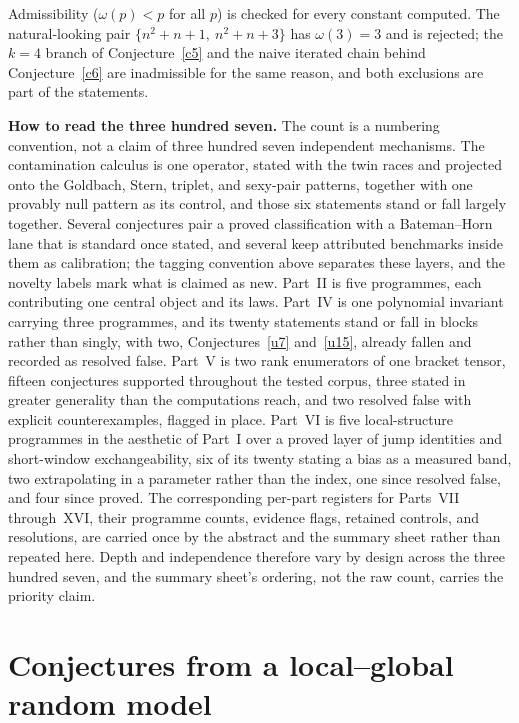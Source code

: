\documentclass[11pt]{article}
\theoremstyle{definition}
\begin{document}
Admissibility ($\omega(p)<p$ for all $p$) is checked for every constant
computed.  The natural-looking pair $\{n^2+n+1,\ n^2+n+3\}$ has
$\omega(3)=3$ and is
rejected; the $k=4$ branch of Conjecture~\ref{c5} and the naive
iterated chain behind Conjecture~\ref{c6} are inadmissible for the
same reason, and both exclusions are part of the statements.

\medskip
\noindent\textbf{How to read the three hundred seven.}  The count is a numbering convention, not a claim of three hundred seven independent mechanisms.  The contamination calculus is one operator, stated with the twin races and projected onto the Goldbach, Stern, triplet, and sexy-pair patterns, together with one provably null pattern as its control, and those six statements stand or fall largely together.  Several conjectures pair a proved classification with a Bateman--Horn lane that is standard once stated, and several keep attributed benchmarks inside them as calibration; the tagging convention above separates these layers, and the novelty labels mark what is claimed as new.  Part~II is five programmes, each contributing one central object and its laws.  Part~IV is one polynomial invariant carrying three programmes, and its twenty statements stand or fall in blocks rather than singly, with two, Conjectures~\ref{u7} and~\ref{u15}, already fallen and recorded as resolved false.  Part~V is two rank enumerators of one bracket tensor, fifteen conjectures supported throughout the tested corpus, three stated in greater generality than the computations reach, and two resolved false with explicit counterexamples, flagged in place.  Part~VI is five local-structure programmes in the aesthetic of Part~I over a proved layer of jump identities and short-window exchangeability, six of its twenty stating a bias as a measured band, two extrapolating in a parameter rather than the index, one since resolved false, and four since proved.  The corresponding per-part registers for Parts~VII through~XVI, their programme counts, evidence flags, retained controls, and resolutions, are carried once by the abstract and the summary sheet rather than repeated here.  Depth and independence therefore vary by design across the three hundred seven, and the summary sheet's ordering, not the raw count, carries the priority claim.

\part{Conjectures from a local--global random model}
\end{document}
